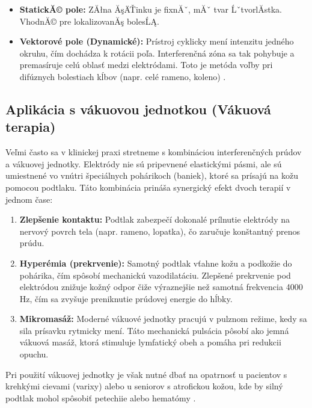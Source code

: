 \begin{itemize}
    \item \textbf{StatickĂ© pole:} ZĂłna ĂşÄŤinku je fixnĂˇ, mĂˇ tvar ĹˇtvorlĂ­stka. VhodnĂ© pre lokalizovanĂş bolesĹĄ.
\end{itemize}

\begin{itemize}
    \item \textbf{Vektorové pole (Dynamické):} Prístroj cyklicky mení intenzitu jedného okruhu, čím dochádza k rotácii poľa. Interferenčná zóna sa tak pohybuje a premasíruje celú oblasť medzi elektródami. Toto je metóda voľby pri difúznych bolestiach kĺbov (napr. celé rameno, koleno) \parencite{Navratil2019}.
\end{itemize}

\subsection{Aplikácia s vákuovou jednotkou (Vákuová terapia)}

Veľmi často sa v klinickej praxi stretneme s kombináciou interferenčných prúdov a vákuovej jednotky. Elektródy nie sú pripevnené elastickými pásmi, ale sú umiestnené vo vnútri špeciálnych pohárikoch (baniek), ktoré sa prísajú na kožu pomocou podtlaku. Táto kombinácia prináša synergický efekt dvoch terapií v jednom čase:

\begin{enumerate}
    \item \textbf{Zlepšenie kontaktu:} Podtlak zabezpečí dokonalé prílnutie elektródy na nervový povrch tela (napr. rameno, lopatka), čo zaručuje konštantný prenos prúdu.
    \item \textbf{Hyperémia (prekrvenie):} Samotný podtlak vťahne kožu a podkožie do pohárika, čím spôsobí mechanickú vazodilatáciu. Zlepšené prekrvenie pod elektródou znižuje kožný odpor čiže výraznejšie než samotná frekvencia 4000 Hz, čím sa zvyšuje preniknutie prúdovej energie do hĺbky.
    \item \textbf{Mikromasáž:} Moderné vákuové jednotky pracujú v pulznom režime, kedy sa sila prísavku rytmicky mení. Táto mechanická pulsácia pôsobí ako jemná vákuová masáž, ktorá stimuluje lymfatický obeh a pomáha pri redukcii opuchu.
\end{enumerate}

Pri použití vákuovej jednotky je však nutné dbať na opatrnosť u pacientov s krehkými cievami (varixy) alebo u seniorov s atrofickou kožou, kde by silný podtlak mohol spôsobiť petechiie alebo hematómy \parencite{Podebradsky2009}.

